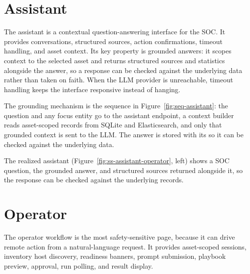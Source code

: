 
\section{Assistant}

The assistant is a contextual question-answering interface for the SOC. It provides conversations, structured sources, action confirmations, timeout handling, and asset context. Its key property is grounded answers: it scopes context to the selected asset and returns structured sources and statistics alongside the answer, so a response can be checked against the underlying data rather than taken on faith. When the LLM provider is unreachable, timeout handling keeps the interface responsive instead of hanging.


The grounding mechanism is the sequence in Figure~\ref{fig:seq-assistant}: the question and any focus entity go to the assistant endpoint, a context builder reads asset-scoped records from SQLite and Elasticsearch, and only that grounded context is sent to the LLM. The answer is stored with its  so it can be checked against the underlying data.


The realized assistant (Figure~\ref{fig:ss-assistant-operator}, left) shows a SOC question, the grounded answer, and structured sources returned alongside it, so the response can be checked against the underlying records.

\section{Operator}

The operator workflow is the most safety-sensitive page, because it can drive remote action from a natural-language request. It provides asset-scoped sessions, inventory host discovery, readiness banners, prompt submission, playbook preview, approval, run polling, and result display.

